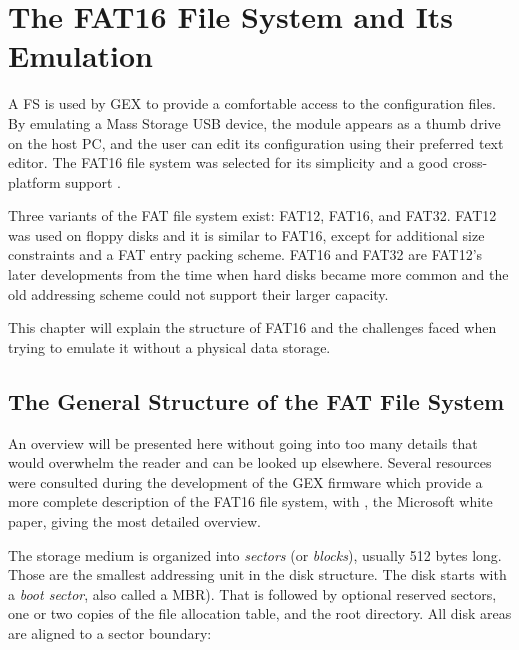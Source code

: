 \chapter{The FAT16 File System and Its Emulation} \label{sec:fat16}

A \gls{FS} is used by GEX to provide a comfortable access to the configuration files. By emulating a Mass Storage \gls{USB} device, the module appears as a thumb drive on the host \gls{PC}, and the user can edit its configuration using their preferred text editor. The FAT16 file system was selected for its simplicity and a good cross-platform support \cite{os-support-table}.

Three variants of the \gls{FAT} file system exist: FAT12, FAT16, and FAT32. FAT12 was used on floppy disks and it is similar to FAT16, except for additional size constraints and a \gls{FAT} entry packing scheme. FAT16 and FAT32 are FAT12's later developments from the time when hard disks became more common and the old addressing scheme could not support their larger capacity.

This chapter will explain the structure of FAT16 and the challenges faced when trying to emulate it without a physical data storage.

\section{The General Structure of the FAT File System}

An overview will be presented here without going into too many details that would overwhelm the reader and can be looked up elsewhere. Several resources \cite{ms-fat,fat16-brainy,fat16-maverick,fat16-phobos,fat-whitepaper} were consulted during the development of the GEX firmware which provide a more complete description of the FAT16 file system, with \cite{fat-whitepaper}, the Microsoft white paper, giving the most detailed overview.

The storage medium is organized into \textit{sectors} (or \textit{blocks}), usually 512 bytes long. Those are the smallest addressing unit in the disk structure. The disk starts with a \textit{boot sector}, also called a \gls{MBR}). That is followed by optional reserved sectors, one or two copies of the file allocation table, and the root directory. All disk areas are aligned to a sector boundary:

